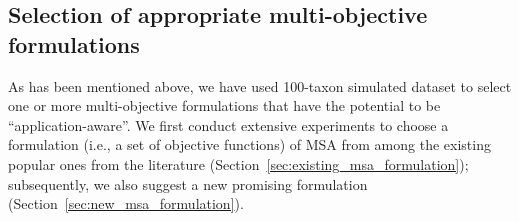 \subsection{Selection of appropriate multi-objective formulations}
\label{sec:selection_msa_formulation}
As has been mentioned above, we have used 100-taxon simulated dataset to select one or more multi-objective formulations that have the potential to be ``application-aware''. We first conduct extensive experiments to choose a formulation (i.e., a set of objective functions) of MSA from among the existing popular ones from the literature (Section~\ref{sec:existing_msa_formulation}); subsequently, we also suggest a new promising formulation (Section~\ref{sec:new_msa_formulation}).  
